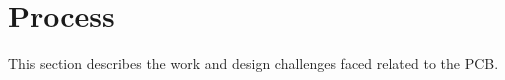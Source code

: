 \section {Process}
This section describes the work and design challenges faced related to the PCB.





